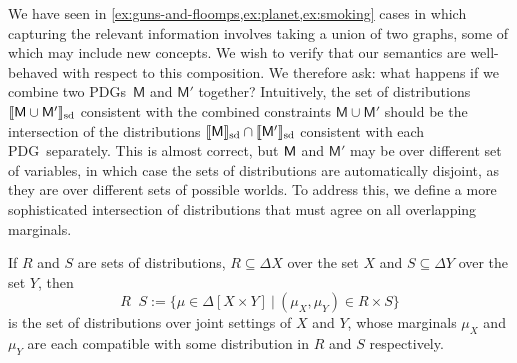 \documentclass{article}
\newcommand{\notation}[2][]{#1}
\renewcommand{\notation}[2][]{{\color{notationcolor} #2}}
\newcommand\SD{_{\text{sd}}}
\DeclareMathOperator\dcap{\mathop{\dot\cap}}
\newcommand{\sfM}{\mathsf M}
\newcommand{\MN}{PDG}
\newcommand{\MNs}{\MN s}
\numberwithin{equation}{section}
\begin{document}
{	%
	We have seen
        in \cref{ex:guns-and-floomps,ex:planet,ex:smoking} cases in
        which capturing the relevant information involves taking a
        union of two graphs, some of which may include new
        concepts. We wish to verify that our semantics are
        well-behaved with respect to this composition.	  
	We therefore ask: what happens if we combine two \MNs\ $\sfM$
        and $\sfM'$ together? Intuitively, the set of distributions
        $\bbr{\sfM \cup \sfM'}\SD$ consistent with the combined
        constraints $\sfM\cup \sfM'$ should be the intersection of the
        distributions $\bbr{\sfM}\SD \cap \bbr{\sfM'}\SD$ consistent
        with each \MN\ separately. This is almost correct, but $\sf M$
        and $\sfM'$ may be over different set of variables, in which
        case the sets of distributions are automatically disjoint, as
        they are over different sets of possible worlds. To address
        this, we define a more sophisticated intersection of
        distributions that must agree on all overlapping
        marginals. %
	
	\begin{defn}[$\dcap$]\label{def:marginal-dist-intersection}
		If $R$ and $S$ are sets of distributions, $R \subseteq \Delta X$ over the set $X$ and $S\subseteq \Delta Y$ over the set $Y$, then
			{$$R \dcap S := \Big\{ \mu \in  \Delta [X \!\times\! Y] ~\Big|~ (\mu_{X}, \mu_{Y}) \in R \times S \Big\}  $$}%
		is the set of distributions over joint settings of $X$ and $Y$, whose marginals $\mu_X$ and $\mu_Y$ are each compatible with some distribution in $R$ and $S$ respectively. 
		

\end{defn}}
\end{document}
